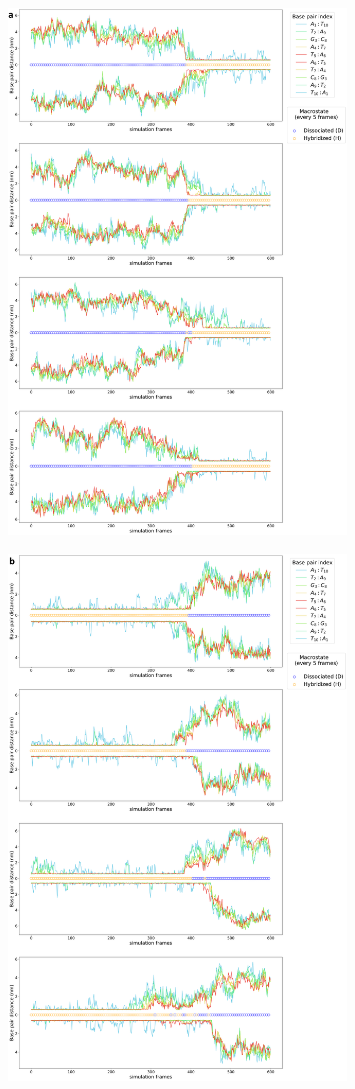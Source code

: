 \documentclass[journal=jpcbfk,manuscript=article]{achemso}
\begin{document}
\begin{figure}[ht!]
	\centering
    \includegraphics[width=0.8\textwidth]{FigS5a.pdf}
\end{figure}
\begin{figure}[ht!]
	\centering
    \includegraphics[width=0.8\textwidth]{FigS5b.pdf}
\end{figure}
\end{document}
